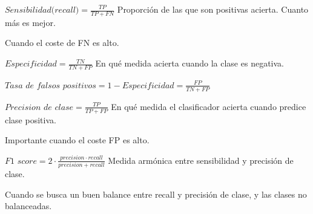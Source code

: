\documentclass[12pt, twoside, openright]{report} %
\begin{document}
\(\textit{Sensibilidad(recall)}= \frac {TP}{TP+FN}\) Proporción de las que son
positivas acierta. Cuanto más es mejor.

Cuando el coste de FN es alto.

\(\textit{Especificidad}= \frac {TN}{TN+FP}\) En qué medida acierta cuando la
clase es negativa.

\(\textit{Tasa de falsos positivos}=1-\textit{Especificidad}= \frac {FP}{TN+FP}\)

\(\textit{Precision de clase}= \frac {TP}{TP+FP}\) En qué medida el
clasificador acierta cuando predice clase positiva.

Importante cuando el coste FP es alto.

\(\textit{F1 score}= 2\cdot \frac {precision \cdot recall}{precision +recall}\)
Medida armónica entre sensibilidad y precisión de clase.

Cuando se busca un buen balance entre recall y precisión de clase, y las
clases no balanceadas.
\end{document}
